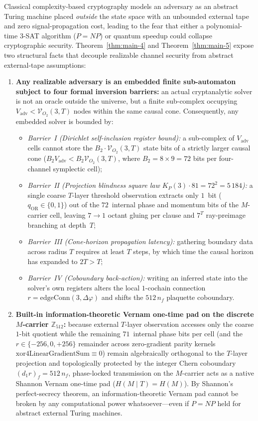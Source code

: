 \documentclass[11pt,a4paper]{article}
\theoremstyle{plain}
\theoremstyle{definition}
\begin{document}
Classical complexity-based cryptography models an adversary as an abstract Turing machine placed \emph{outside} the state space with an unbounded external tape and zero signal-propagation cost, leading to the fear that either a polynomial-time 3-SAT algorithm ($P=NP$) or quantum speedup could collapse cryptographic security. Theorem~\ref{thm:main-4} and Theorem~\ref{thm:main-5} expose two structural facts that decouple realizable channel security from abstract external-tape assumptions:
\begin{enumerate}[label=\textbf{(\arabic*)},leftmargin=*]
\item \textbf{Any realizable adversary is an embedded finite sub-automaton subject to four formal inversion barriers:}
  an actual cryptanalytic solver is not an oracle outside the universe, but a finite sub-complex occupying $V_{\mathrm{adv}} < \mathcal{V}_{O_2}(3,T)$ nodes within the same causal cone. Consequently, any embedded solver is bounded by:
  \begin{itemize}[noitemsep]
  \item \emph{Barrier~I (Dirichlet self-inclusion register bound):} a sub-complex of $V_{\mathrm{adv}}$ cells cannot store the $B_2\cdot\mathcal{V}_{O_2}(3,T)$ state bits of a strictly larger causal cone ($B_2 V_{\mathrm{adv}} < B_2\mathcal{V}_{O_2}(3,T)$, where $B_2 = 8\times 9 = 72$ bits per four-channel symplectic cell);
  \item \emph{Barrier~II (Projection blindness square law $K_P(3)\cdot 81 = 72^2 = 5\,184$):} a single coarse $T$-layer threshold observation extracts only $1$~bit ($q_{\mathrm{OR}}\in\{0,1\}$) out of the $72$~internal phase and momentum bits of the $M$-carrier cell, leaving $7\to 1$ octant gluing per clause and $7^T$ ray-preimage branching at depth~$T$;
  \item \emph{Barrier~III (Cone-horizon propagation latency):} gathering boundary data across radius $T$ requires at least $T$ steps, by which time the causal horizon has expanded to $2T > T$;
  \item \emph{Barrier~IV (Coboundary back-action):} writing an inferred state into the solver's own registers alters the local $1$-cochain connection $r = \mathrm{edgeConn}(3,\Delta\varphi)$ and shifts the $512\,n_f$ plaquette coboundary.
  \end{itemize}
\item \textbf{Built-in information-theoretic Vernam one-time pad on the discrete $M$-carrier $\mathbb{Z}_{512}$:}
  because external $T$-layer observation accesses only the coarse $1$-bit quotient while the remaining $71$~internal phase bits per cell (and the $r\in\{-256,0,+256\}$ remainder across zero-gradient parity kernels $\mathrm{xor4LinearGradientSum}\equiv 0$) remain algebraically orthogonal to the $T$-layer projection and topologically protected by the integer Chern coboundary $(d_1 r)_f = 512\,n_f$, phase-locked transmission on the $M$-carrier acts as a native Shannon Vernam one-time pad ($H(M\mid T) = H(M)$). By Shannon's perfect-secrecy theorem, an information-theoretic Vernam pad cannot be broken by any computational power whatsoever---even if $P=NP$ held for abstract external Turing machines.
\end{enumerate}
\end{document}
